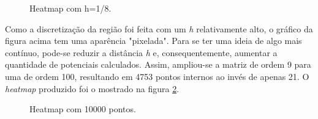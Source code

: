 \documentclass[a4paper,11pt]{article}
\begin{document}
    \begin{figure}[H]
        \centering
        \caption[width=\columnwidth]{Heatmap com h=1/8.}
        \label{heatmap}
    \end{figure}
    
    Como a discretização da região foi feita com um \textit{h} relativamente alto, o gráfico da figura acima tem uma aparência "pixelada". Para se ter uma ideia de algo mais contínuo, pode-se reduzir a distância \textit{h} e, consequentemente, aumentar a quantidade de potenciais calculados. Assim, ampliou-se a matriz de ordem 9 para uma de ordem 100, resultando em 4753 pontos internos ao invés de apenas 21. O \textit{heatmap} produzido foi o mostrado na figura \ref{heatmap100}.
    
    \begin{figure}[H]
        \centering
        \caption[width=\columnwidth]{Heatmap com 10000 pontos.}
        \label{heatmap100}
    \end{figure}
    
\end{document}
